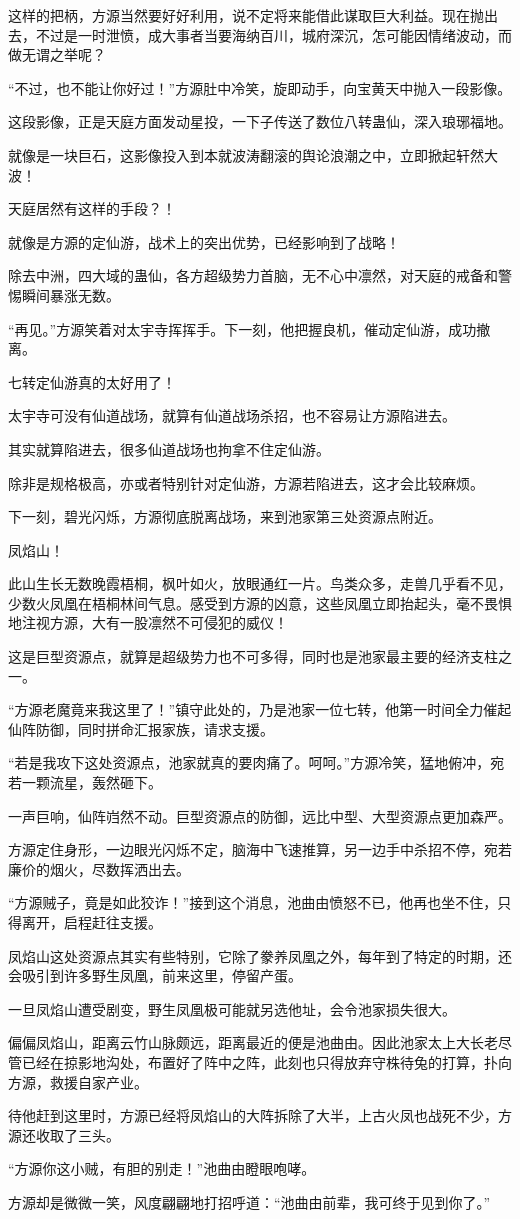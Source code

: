 \begin{this_body}
这样的把柄，方源当然要好好利用，说不定将来能借此谋取巨大利益。现在抛出去，不过是一时泄愤，成大事者当要海纳百川，城府深沉，怎可能因情绪波动，而做无谓之举呢？

“不过，也不能让你好过！”方源肚中冷笑，旋即动手，向宝黄天中抛入一段影像。

这段影像，正是天庭方面发动星投，一下子传送了数位八转蛊仙，深入琅琊福地。

就像是一块巨石，这影像投入到本就波涛翻滚的舆论浪潮之中，立即掀起轩然大波！

天庭居然有这样的手段？！

就像是方源的定仙游，战术上的突出优势，已经影响到了战略！

除去中洲，四大域的蛊仙，各方超级势力首脑，无不心中凛然，对天庭的戒备和警惕瞬间暴涨无数。

“再见。”方源笑着对太宇寺挥挥手。下一刻，他把握良机，催动定仙游，成功撤离。

七转定仙游真的太好用了！

太宇寺可没有仙道战场，就算有仙道战场杀招，也不容易让方源陷进去。

其实就算陷进去，很多仙道战场也拘拿不住定仙游。

除非是规格极高，亦或者特别针对定仙游，方源若陷进去，这才会比较麻烦。

下一刻，碧光闪烁，方源彻底脱离战场，来到池家第三处资源点附近。

凤焰山！

此山生长无数晚霞梧桐，枫叶如火，放眼通红一片。鸟类众多，走兽几乎看不见，少数火凤凰在梧桐林间气息。感受到方源的凶意，这些凤凰立即抬起头，毫不畏惧地注视方源，大有一股凛然不可侵犯的威仪！

这是巨型资源点，就算是超级势力也不可多得，同时也是池家最主要的经济支柱之一。

“方源老魔竟来我这里了！”镇守此处的，乃是池家一位七转，他第一时间全力催起仙阵防御，同时拼命汇报家族，请求支援。

“若是我攻下这处资源点，池家就真的要肉痛了。呵呵。”方源冷笑，猛地俯冲，宛若一颗流星，轰然砸下。

一声巨响，仙阵岿然不动。巨型资源点的防御，远比中型、大型资源点更加森严。

方源定住身形，一边眼光闪烁不定，脑海中飞速推算，另一边手中杀招不停，宛若廉价的烟火，尽数挥洒出去。

“方源贼子，竟是如此狡诈！”接到这个消息，池曲由愤怒不已，他再也坐不住，只得离开，启程赶往支援。

凤焰山这处资源点其实有些特别，它除了豢养凤凰之外，每年到了特定的时期，还会吸引到许多野生凤凰，前来这里，停留产蛋。

一旦凤焰山遭受剧变，野生凤凰极可能就另选他址，会令池家损失很大。

偏偏凤焰山，距离云竹山脉颇远，距离最近的便是池曲由。因此池家太上大长老尽管已经在掠影地沟处，布置好了阵中之阵，此刻也只得放弃守株待兔的打算，扑向方源，救援自家产业。

待他赶到这里时，方源已经将凤焰山的大阵拆除了大半，上古火凤也战死不少，方源还收取了三头。

“方源你这小贼，有胆的别走！”池曲由瞪眼咆哮。

方源却是微微一笑，风度翩翩地打招呼道：“池曲由前辈，我可终于见到你了。”

\end{this_body}

